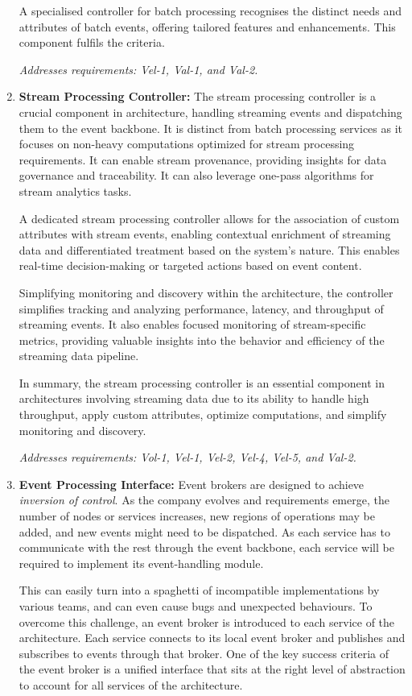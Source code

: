 \documentclass[journal]{IEEEtran}
\begin{document}
\begin{enumerate}
    A specialised controller for batch processing recognises the distinct needs and attributes of batch events, offering tailored features and enhancements. This component fulfils the criteria.

    \textit{Addresses requirements: Vel-1, Val-1, and Val-2.}
    
    \item \textbf{Stream Processing Controller:}  The stream processing controller is a crucial component in architecture, handling streaming events and dispatching them to the event backbone. It is distinct from batch processing services as it focuses on non-heavy computations optimized for stream processing requirements. It can enable stream provenance, providing insights for data governance and traceability. It can also leverage one-pass algorithms for stream analytics tasks.

    A dedicated stream processing controller allows for the association of custom attributes with stream events, enabling contextual enrichment of streaming data and differentiated treatment based on the system's nature. This enables real-time decision-making or targeted actions based on event content.
    
    Simplifying monitoring and discovery within the architecture, the controller simplifies tracking and analyzing performance, latency, and throughput of streaming events. It also enables focused monitoring of stream-specific metrics, providing valuable insights into the behavior and efficiency of the streaming data pipeline.
    
    In summary, the stream processing controller is an essential component in architectures involving streaming data due to its ability to handle high throughput, apply custom attributes, optimize computations, and simplify monitoring and discovery. 
    
    \textit{Addresses requirements: Vol-1, Vel-1, Vel-2, Vel-4, Vel-5, and Val-2.}

    
    \item \textbf{Event Processing Interface:} Event brokers are designed to achieve \emph{inversion of control}. As the company evolves and requirements emerge, the number of nodes or services increases, new regions of operations may be added, and new events might need to be dispatched. As each service has to communicate with the rest through the event backbone, each service will be required to implement its event-handling module. 
    
    This can easily turn into a spaghetti of incompatible implementations by various teams, and can even cause bugs and unexpected behaviours. To overcome this challenge, an event broker is introduced to each service of the architecture. Each service connects to its local event broker and publishes and subscribes to events through that broker. One of the key success criteria of the event broker is a unified interface that sits at the right level of abstraction to account for all services of the architecture. 
    

\end{enumerate}
\end{document}
